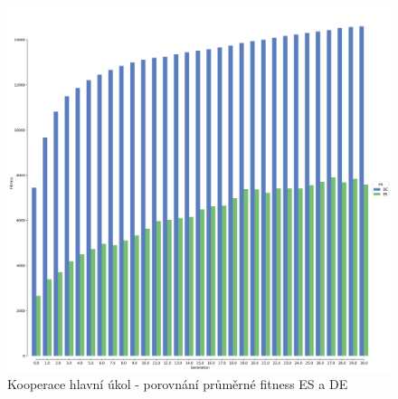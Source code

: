 		\begin{figure}[t]\centering
		\includegraphics[width=\columnwidth]{../img/WoodMap/DEvsES/WoodCoop.png}
		\caption{Kooperace  hlavní úkol  - porovnání průměrné fitness ES a DE}
		\label{obr04:CoopESvsDE}
	\end{figure}
